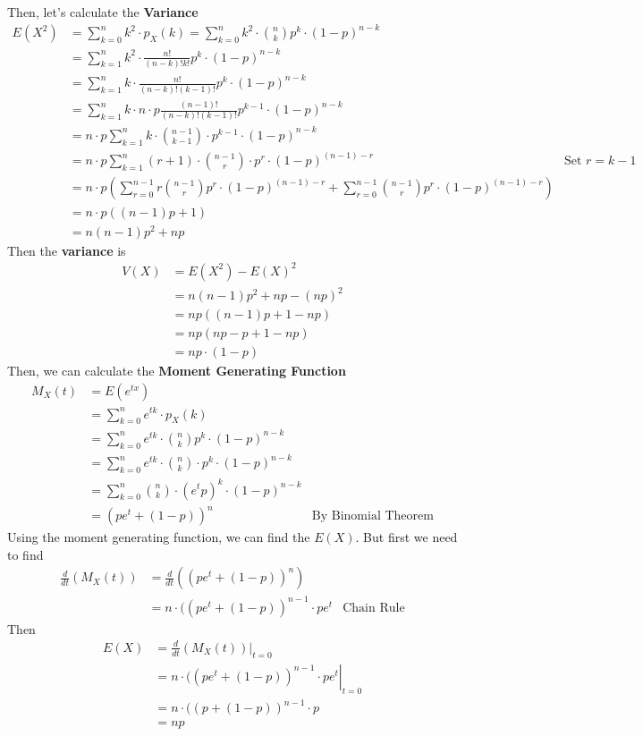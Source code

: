 \documentclass[11pt,oneside]{book}
\theoremstyle{break}
\theoremstyle{break}
\begin{document}
Then, let's calculate the \textbf{Variance}
 \begin{align*}
E(X^2)&=\sum_{k=0}^n k^2\cdot p_X(k)=\sum_{k=0}^{n}k^2\cdot \binom nk p^k\cdot (1-p)^{n-k}\\
&=\sum_{k=1}^{n}k^2 \cdot \frac{n!}{(n-k)!k!} p^k\cdot (1-p)^{n-k}\\
&=\sum_{k=1}^{n}k\cdot \frac{n!}{(n-k)!(k-1)!} p^k\cdot (1-p)^{n-k}\\
&=\sum_{k=1}^{n}k\cdot n \cdot p \frac{(n-1)!}{(n-k)!(k-1)!} p^{k-1}\cdot (1-p)^{n-k}\\
&= n \cdot p\sum_{k=1}^{n}k\cdot \binom{n-1}{k-1}\cdot p^{k-1}\cdot (1-p)^{n-k}\\
&= n \cdot p\sum_{k=1}^{n}(r+1)\cdot \binom{n-1}{r}\cdot p^{r}\cdot (1-p)^{(n-1)-r}&\text{Set } r=k-1\\
&=n\cdot p \left( \sum_{r=0}^{n-1}r\binom{n-1}{r}p^r\cdot (1-p)^{(n-1)-r}+\sum_{r=0}^{n-1}\binom{n-1}{r}p^r\cdot (1-p)^{(n-1)-r} \right)\\
&=n\cdot p((n-1)p+1)\\
&=n(n-1)p^2+np
\end{align*}
Then the \textbf{variance} is
\begin{align*}
V(X)&=E(X^2)-E(X)^2\\
&=n(n-1)p^2+np-(np)^2\\
&=np((n-1)p+1-np)\\
&=np(np-p+1-np)\\
&=np\cdot (1-p)
\end{align*}
Then, we can calculate the \textbf{Moment Generating Function} \begin{align*}
M_X(t)&=E(e^{tx})\\
&=\sum_{k=0}^n e^{tk}\cdot p_X(k)\\
&=\sum_{k=0}^{n}e^{tk}\cdot \binom nk p^k\cdot (1-p)^{n-k}\\
&=\sum_{k=0}^{n}e^{tk} \cdot \binom nk \cdot p^k\cdot (1-p)^{n-k}\\
&=\sum_{k=0}^{n}\binom nk  \cdot (e^tp)^k\cdot (1-p)^{n-k}\\
&=(pe^t+(1-p))^n &\text{By Binomial Theorem}
\end{align*}
Using the moment generating function, we can find the $E(X)$. But first we need to find
\begin{align*}
\frac{d}{dt}\left(M_X(t) \right)&=\frac{d}{dt}((pe^t+(1-p))^n)\\
&=n\cdot ((pe^t+(1-p))^{n-1}\cdot pe^t &\text{Chain Rule}
\end{align*}
Then
 \begin{align*}
E(X)&=\frac{d}{dt}\left. \left(M_X(t) \right)\right|_{t=0}\\
&=\left. n\cdot ((pe^t+(1-p))^{n-1}\cdot pe^t \right|_{t=0}\\
&=n\cdot ((p+(1-p))^{n-1}\cdot p\\
&=np
\end{align*}
\end{document}
